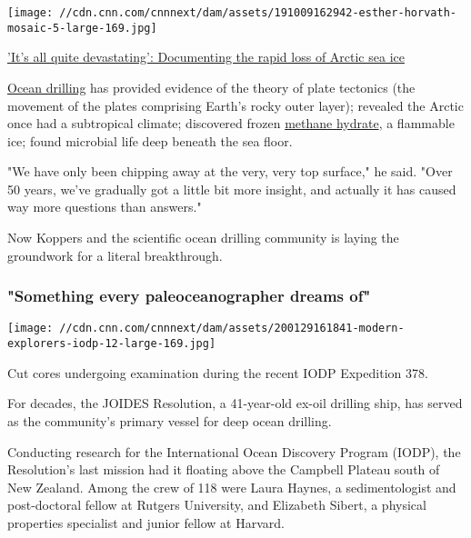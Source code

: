 \href{/travel/article/documenting-arctic-ice-melt/index.html}{}

\texttt{[image: //cdn.cnn.com/cnnnext/dam/assets/191009162942-esther-horvath-mosaic-5-large-169.jpg]}

\href{/travel/article/documenting-arctic-ice-melt/index.html}{'It's all
quite devastating': Documenting the rapid loss of Arctic sea ice}

\href{https://joidesresolution.org/about-the-jr/}{Ocean drilling} has
provided evidence of the theory of plate tectonics (the movement of the
plates comprising Earth's rocky outer layer); revealed the Arctic once
had a subtropical climate; discovered frozen
\href{https://cnn.com/2017/10/31/asia/on-japan-flammable-ice/index.html}{methane
hydrate}, a flammable ice; found microbial life deep beneath the sea
floor.

"We have only been chipping away at the very, very top surface," he
said. "Over 50 years, we've gradually got a little bit more insight, and
actually it has caused way more questions than answers."

Now Koppers and the scientific ocean drilling community is laying the
groundwork for a literal breakthrough.

\hypertarget{something-every-paleoceanographer-dreams-of}{%
\subsubsection{"Something every paleoceanographer dreams
of"}\label{something-every-paleoceanographer-dreams-of}}

\texttt{[image: //cdn.cnn.com/cnnnext/dam/assets/200129161841-modern-explorers-iodp-12-large-169.jpg]}

Cut cores undergoing examination during the recent IODP Expedition 378.

For decades, the JOIDES Resolution, a 41-year-old ex-oil drilling ship,
has served as the community's primary vessel for deep ocean drilling.

Conducting research for the International Ocean Discovery Program
(IODP), the Resolution's last mission had it floating above the Campbell
Plateau south of New Zealand. Among the crew of 118 were Laura Haynes, a
sedimentologist and post-doctoral fellow at Rutgers University, and
Elizabeth Sibert, a physical properties specialist and junior fellow at
Harvard.

\href{/2019/10/08/world/david-de-rothschild-modern-explorers/index.html}{}

